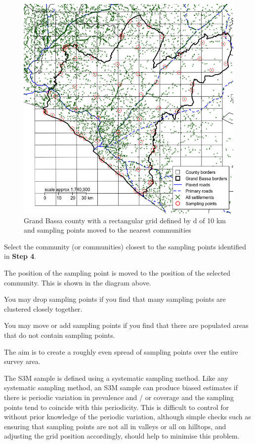 \documentclass[12pt,a4paper]{book}
\theoremstyle{definition}
\theoremstyle{definition}
\theoremstyle{definition}
\theoremstyle{remark}
\let\BeginKnitrBlock\begin \let\EndKnitrBlock\end
\begin{document}
\begin{figure}[H]

{\centering \includegraphics{figures/grid4-1} 

}

\caption{Grand Bassa county with a rectangular grid defined by d of 10 km and sampling points moved to the nearest communities}\label{fig:grid4}
\end{figure}

Select the community (or communities) closest to the sampling points
identified in \textbf{Step 4}.

The position of the sampling point is moved to the position of the
selected community. This is shown in the diagram above.

You may drop sampling points if you find that many sampling points are
clustered closely together.

You may move or add sampling points if you find that there are populated
areas that do not contain sampling points.

The aim is to create a roughly even spread of sampling points over the
entire survey area.

\BeginKnitrBlock{rmdcaution}
The S3M sample is defined using a systematic sampling method. Like any
systematic sampling method, an S3M sample can produce biased estimates
if there is periodic variation in prevalence and / or coverage and the
sampling points tend to coincide with this periodicity. This is
difficult to control for without prior knowledge of the periodic
variation, although simple checks such as ensuring that sampling points
are not all in valleys or all on hilltops, and adjusting the grid
position accordingly, should help to minimise this problem.
\EndKnitrBlock{rmdcaution}
\end{document}
